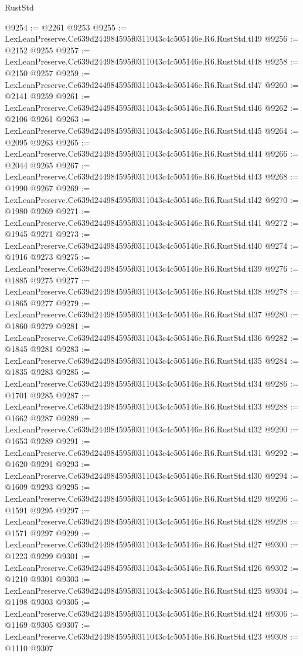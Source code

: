 \begin{lexlean}{RustStd}
\begin{coremodule}
@9254 := @2261 @9253
@9255 := LexLeanPreserve.Cc639d244984595f0311043c4c505146e.R6.RustStd.tl49
@9256 := @2152 @9255
@9257 := LexLeanPreserve.Cc639d244984595f0311043c4c505146e.R6.RustStd.tl48
@9258 := @2150 @9257
@9259 := LexLeanPreserve.Cc639d244984595f0311043c4c505146e.R6.RustStd.tl47
@9260 := @2141 @9259
@9261 := LexLeanPreserve.Cc639d244984595f0311043c4c505146e.R6.RustStd.tl46
@9262 := @2106 @9261
@9263 := LexLeanPreserve.Cc639d244984595f0311043c4c505146e.R6.RustStd.tl45
@9264 := @2095 @9263
@9265 := LexLeanPreserve.Cc639d244984595f0311043c4c505146e.R6.RustStd.tl44
@9266 := @2044 @9265
@9267 := LexLeanPreserve.Cc639d244984595f0311043c4c505146e.R6.RustStd.tl43
@9268 := @1990 @9267
@9269 := LexLeanPreserve.Cc639d244984595f0311043c4c505146e.R6.RustStd.tl42
@9270 := @1980 @9269
@9271 := LexLeanPreserve.Cc639d244984595f0311043c4c505146e.R6.RustStd.tl41
@9272 := @1945 @9271
@9273 := LexLeanPreserve.Cc639d244984595f0311043c4c505146e.R6.RustStd.tl40
@9274 := @1916 @9273
@9275 := LexLeanPreserve.Cc639d244984595f0311043c4c505146e.R6.RustStd.tl39
@9276 := @1885 @9275
@9277 := LexLeanPreserve.Cc639d244984595f0311043c4c505146e.R6.RustStd.tl38
@9278 := @1865 @9277
@9279 := LexLeanPreserve.Cc639d244984595f0311043c4c505146e.R6.RustStd.tl37
@9280 := @1860 @9279
@9281 := LexLeanPreserve.Cc639d244984595f0311043c4c505146e.R6.RustStd.tl36
@9282 := @1845 @9281
@9283 := LexLeanPreserve.Cc639d244984595f0311043c4c505146e.R6.RustStd.tl35
@9284 := @1835 @9283
@9285 := LexLeanPreserve.Cc639d244984595f0311043c4c505146e.R6.RustStd.tl34
@9286 := @1701 @9285
@9287 := LexLeanPreserve.Cc639d244984595f0311043c4c505146e.R6.RustStd.tl33
@9288 := @1662 @9287
@9289 := LexLeanPreserve.Cc639d244984595f0311043c4c505146e.R6.RustStd.tl32
@9290 := @1653 @9289
@9291 := LexLeanPreserve.Cc639d244984595f0311043c4c505146e.R6.RustStd.tl31
@9292 := @1620 @9291
@9293 := LexLeanPreserve.Cc639d244984595f0311043c4c505146e.R6.RustStd.tl30
@9294 := @1609 @9293
@9295 := LexLeanPreserve.Cc639d244984595f0311043c4c505146e.R6.RustStd.tl29
@9296 := @1591 @9295
@9297 := LexLeanPreserve.Cc639d244984595f0311043c4c505146e.R6.RustStd.tl28
@9298 := @1571 @9297
@9299 := LexLeanPreserve.Cc639d244984595f0311043c4c505146e.R6.RustStd.tl27
@9300 := @1223 @9299
@9301 := LexLeanPreserve.Cc639d244984595f0311043c4c505146e.R6.RustStd.tl26
@9302 := @1210 @9301
@9303 := LexLeanPreserve.Cc639d244984595f0311043c4c505146e.R6.RustStd.tl25
@9304 := @1198 @9303
@9305 := LexLeanPreserve.Cc639d244984595f0311043c4c505146e.R6.RustStd.tl24
@9306 := @1169 @9305
@9307 := LexLeanPreserve.Cc639d244984595f0311043c4c505146e.R6.RustStd.tl23
@9308 := @1110 @9307

\end{coremodule}
\end{lexlean}

